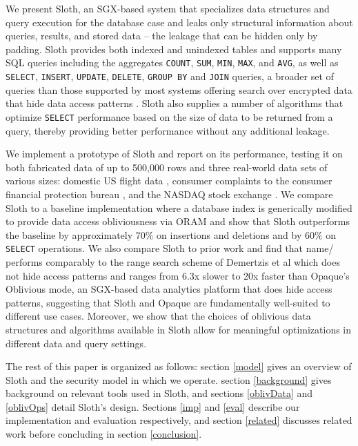 \documentclass[USenglish,oneside,twocolumn]{article}
\def\name/{Sloth}
\begin{document}
We present \name/, an SGX-based system that specializes data structures and query execution for the database case and leaks only structural information about queries, results, and stored data -- the leakage that can be hidden only by padding. \name/ provides both indexed and unindexed tables and supports many SQL queries including the aggregates \texttt{COUNT}, \texttt{SUM}, \texttt{MIN}, \texttt{MAX}, and \texttt{AVG}, as well as \texttt{SELECT}, \texttt{INSERT}, \texttt{UPDATE}, \texttt{DELETE}, \texttt{GROUP BY} and \texttt{JOIN} queries, a broader set of queries than those supported by most systems offering search over encrypted data that hide data access patterns \cite{FVY+17}. \name/ also supplies a number of algorithms that optimize \texttt{SELECT} performance based on the size of data to be returned from a query, thereby providing better performance without any additional leakage. 

We implement a prototype of \name/ and report on its performance, testing it on both fabricated data of up to 500,000 rows and three real-world data sets of various sizes: domestic US flight data \cite{FLIGHT}, consumer complaints to the consumer financial protection bureau \cite{CFPB}, and the NASDAQ stock exchange \cite{NASDAQ}. We compare \name/ to a baseline implementation where a database index is generically modified to provide data access obliviousness via ORAM and show that \name/ outperforms the baseline by approximately 70\% on insertions and deletions and by 60\% on \texttt{SELECT} operations. We also compare \name/ to prior work and find that name/ performs comparably to the range search scheme of Demertzis et al \cite{DPP+16} which does not hide access patterns and ranges from 6.3x slower to 20x faster than Opaque's Oblivious mode, an SGX-based data analytics platform that does hide access patterns, suggesting that \name/ and Opaque are fundamentally well-suited to different use cases. Moreover, we show that the choices of oblivious data structures and algorithms available in \name/ allow for meaningful optimizations in different data and query settings. 

The rest of this paper is organized as follows: section \ref{model} gives an overview of \name/ and the security model in which we operate. section \ref{background} gives background on relevant tools used in \name/, and sections \ref{oblivData} and \ref{oblivOps} detail \name/'s design. Sections \ref{imp} and \ref{eval} describe our implementation and evaluation respectively, and section \ref{related} discusses related work before concluding in section \ref{conclusion}. 
\end{document}
